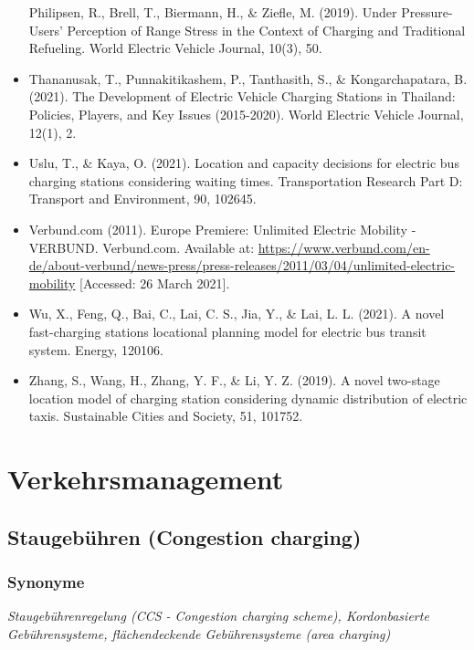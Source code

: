 \documentclass[
]{book}
\begin{document}
\begin{itemize}
  Philipsen, R., Brell, T., Biermann, H., \& Ziefle, M. (2019). Under Pressure-Users' Perception of Range Stress in the Context of Charging and Traditional Refueling. World Electric Vehicle Journal, 10(3), 50.
\item
  Thananusak, T., Punnakitikashem, P., Tanthasith, S., \& Kongarchapatara, B. (2021). The Development of Electric Vehicle Charging Stations in Thailand: Policies, Players, and Key Issues (2015-2020). World Electric Vehicle Journal, 12(1), 2.
\item
  Uslu, T., \& Kaya, O. (2021). Location and capacity decisions for electric bus charging stations considering waiting times. Transportation Research Part D: Transport and Environment, 90, 102645.
\item
  Verbund.com (2011). Europe Premiere: Unlimited Electric Mobility - VERBUND. Verbund.com. Available at: \url{https://www.verbund.com/en-de/about-verbund/news-press/press-releases/2011/03/04/unlimited-electric-mobility} {[}Accessed: 26 March 2021{]}.
\item
  Wu, X., Feng, Q., Bai, C., Lai, C. S., Jia, Y., \& Lai, L. L. (2021). A novel fast-charging stations locational planning model for electric bus transit system. Energy, 120106.
\item
  Zhang, S., Wang, H., Zhang, Y. F., \& Li, Y. Z. (2019). A novel two-stage location model of charging station considering dynamic distribution of electric taxis. Sustainable Cities and Society, 51, 101752.
\end{itemize}

\hypertarget{traffic}{%
\chapter{Verkehrsmanagement}\label{traffic}}

\hypertarget{congestion_charging}{%
\section{Staugebühren (Congestion charging)}\label{congestion_charging}}

\hypertarget{synonyme-8}{%
\subsection*{Synonyme}\label{synonyme-8}}

\emph{Staugebührenregelung (CCS - Congestion charging scheme), Kordonbasierte Gebührensysteme, flächendeckende Gebührensysteme (area charging)}
\end{document}
